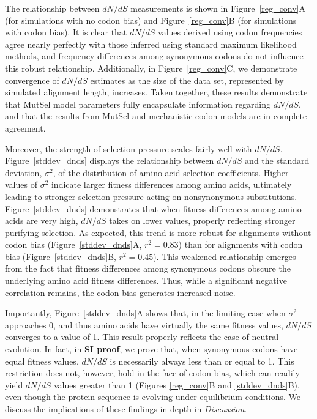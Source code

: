 \documentclass[11pt]{article}
\begin{document}
The relationship between $dN/dS$ measurements is shown in Figure~\ref{reg_conv}A (for simulations with no codon bias) and Figure~\ref{reg_conv}B (for simulations with codon bias). It is clear that $dN/dS$ values derived using codon frequencies agree nearly perfectly with those inferred using standard maximum likelihood methods, and frequency differences among synonymous codons do not influence this robust relationship. Additionally, in Figure~\ref{reg_conv}C, we demonstrate convergence of $dN/dS$ estimates as the size of the data set, represented by simulated alignment length, increases. Taken together, these results demonstrate that MutSel model parameters fully encapsulate information regarding $dN/dS$, and that the results from MutSel and mechanistic codon models are in complete agreement.

Moreover, the strength of selection pressure scales fairly well with $dN/dS$. Figure~\ref{stddev_dnds} displays the relationship between $dN/dS$ and the standard deviation, $\sigma^2$, of the distribution of amino acid selection coefficients. Higher values of $\sigma^2$ indicate larger fitness differences among amino acids, ultimately leading to stronger selection pressure acting on nonsynonymous substitutions. Figure~\ref{stddev_dnds} demonstrates that when fitness differences among amino acids are very high, $dN/dS$ takes on lower values, properly reflecting stronger purifying selection. As expected, this trend is more robust for alignments without codon bias (Figure~\ref{stddev_dnds}A, $r^2 = 0.83$) than for alignments with codon bias (Figure~\ref{stddev_dnds}B, $r^2 = 0.45$). This weakened relationship emerges from the fact that fitness differences among synonymous codons obscure the underlying amino acid fitness differences. Thus, while a significant negative correlation remains, the codon bias generates increased noise.

Importantly, Figure~\ref{stddev_dnds}A shows that, in the limiting case when $\sigma^2$ approaches 0, and thus amino acids have virtually the same fitness values, $dN/dS$ converges to a value of 1. This result properly reflects the case of neutral evolution. In fact, in \textbf{SI proof}, we prove that, when synonymous codons have equal fitness values, $dN/dS$ is necessarily always less than or equal to 1. This restriction does not, however, hold in the face of codon bias, which can readily yield $dN/dS$ values greater than 1 (Figures \ref{reg_conv}B and \ref{stddev_dnds}B), even though the protein sequence is evolving under equilibrium conditions. We discuss the implications of these findings in depth in \textit{Discussion}.
\end{document}
